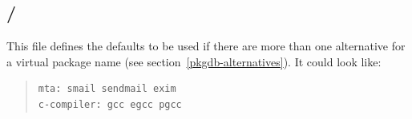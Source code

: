 \documentclass[10pt]{article}
\begin{document}
\subsection{\PKGDBULIBPATH\slash\ALTDEFAULTSFILENAME}

This file defines the defaults to be used if there are more than one
alternative for a virtual package name (see
section~\ref{pkgdb-alternatives}). It could look like:
\begin{quote}
\begin{verbatim}
mta: smail sendmail exim
c-compiler: gcc egcc pgcc
\end{verbatim}
\end{quote}
\end{document}

